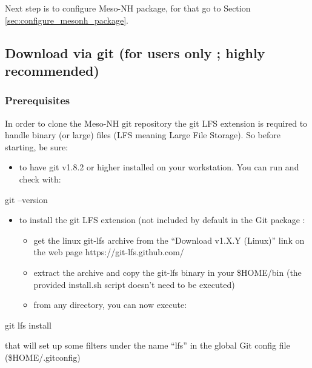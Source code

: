 Next step is to configure Meso-NH package, for that go to Section \ref{sec:configure_mesonh_package}.

\subsection{Download via git (for users only ; highly recommended)}
\label{subsec:mesonh_git}



\subsubsection{Prerequisites}

 In order to clone the Meso-NH git repository the git LFS extension is required to handle binary (or large) files (LFS meaning Large File Storage). So before starting, be sure:
\begin{itemize}
    \item to have git v1.8.2 or higher installed on your workstation. You can run and check with:
\end{itemize}
\begin{bashcode}
 git --version
\end{bashcode}
\begin{itemize}
\item to install the git LFS extension (not included by default in the Git package :
\begin{itemize}
\item get the linux git-lfs archive from the ``Download v1.X.Y (Linux)'' link on the web page https://git-lfs.github.com/
\item extract the archive and copy the git-lfs binary in your \$HOME/bin (the provided install.sh script doesn't need to be executed)
\item from any directory, you can now execute:
\end{itemize}
\end{itemize}
\begin{bashcode}
git lfs install
\end{bashcode}
that will set up some filters under the name ``lfs'' in the global Git config file (\$HOME/.gitconfig)
 
